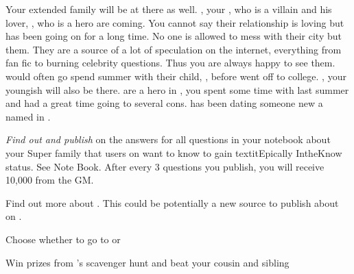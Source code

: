 \documentclass[char]{LRSguildcamp1}
\begin{document}
Your extended family will be at there as well. \cOldest{}, your \cOldest{\uncle}, who is a villain and his lover, \cOS{}, who is a hero are coming. You cannot say their relationship is loving but has been going on for a long time. No one is allowed to mess with their city but them. They are a source of a lot of speculation on the internet, everything from fan fic to burning celebrity questions. Thus you are always happy to see them. \cTeen{} would often go spend summer with their child, \cGrad{}, before \cGrad{\they} went off to college.  \cYoungest{}, your youngish \cYoungest{\uncle} will also be there.  are a hero in \pCityYoungest{}, you spent some time with \cYoungest{\them} last summer and had a great time going to several cons.  \cYoungest{} has been dating someone new a \cAS{\hero} named \cAS{} in \pCityYoungest{}. 


\begin{itemz}[Goals]
	\item \textit{Find out and publish} on \pTweenwebsite{} the answers for all questions in your notebook about your Super family that users on \pTweenwebsite{} want to know to gain textit{Epically IntheKnow} status. See Note Book.	After every 3 questions you publish, you will receive 10,000 from the GM.
	
	\item Find out more about \cAS{}. This could be potentially a new source to publish about on \pTweenwebsite{}.
	
	\item Choose whether to go to \pSuperSchool{} or \pNormalSchool{}
	
	\item Win prizes from \cGrandma{}'s scavenger hunt and beat your cousin and sibling
\end{itemz}
\end{document}
